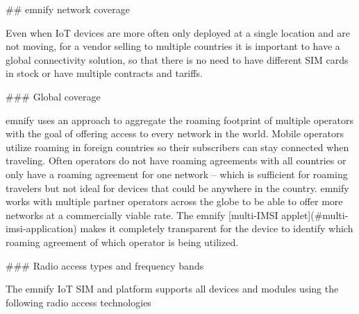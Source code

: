 \documentclass[11pt, oneside]{article}   	%
\newcommand{\addspace}{\vspace{2mm}}
\begin{document}
\begin{markdown}

## emnify network coverage

Even when IoT devices are more often only deployed at a single location and are not moving, for a vendor selling to multiple countries it is important to have a global connectivity solution, so that there is no need to have different SIM cards in stock or have multiple contracts and tariffs.

### Global coverage

emnify uses an approach to aggregate the roaming footprint of multiple operators with the goal of offering access to every network in the world.
Mobile operators utilize roaming in foreign countries so their subscribers can stay connected when traveling.
Often operators do not have roaming agreements with all countries or only have a roaming agreement for one network -- which is sufficient for roaming travelers but not ideal for devices that could be anywhere in the country.
emnify works with multiple partner operators across the globe to be able to offer more networks at a commercially viable rate.
The emnify [multi-IMSI applet](#multi-imsi-application) makes it completely transparent for the device to identify which roaming agreement of which operator is being utilized.

### Radio access types and frequency bands

The emnify IoT SIM and platform supports all devices and modules using the following radio access technologies
\end{markdown}
\addspace
{}
\addspace
{}
\end{document}

